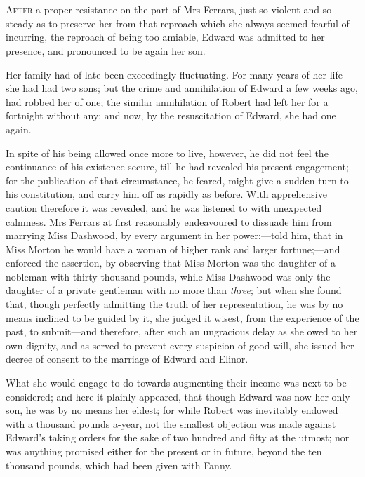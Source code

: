 \chapter[Chapter \thechapter]{}
\lettrine[lines=4,lraise=0.3]{A}{fter} a proper resistance on the part of Mrs Ferrars, just so violent and so steady as to preserve her from that reproach which she always seemed fearful of incurring, the reproach of being too amiable, Edward was admitted to her presence, and pronounced to be again her son.

Her family had of late been exceedingly fluctuating. For many years of her life she had had two sons; but the crime and annihilation of Edward a few weeks ago, had robbed her of one; the similar annihilation of Robert had left her for a fortnight without any; and now, by the resuscitation of Edward, she had one again.

In spite of his being allowed once more to live, however, he did not feel the continuance of his existence secure, till he had revealed his present engagement; for the publication of that circumstance, he feared, might give a sudden turn to his constitution, and carry him off as rapidly as before. With apprehensive caution therefore it was revealed, and he was listened to with unexpected calmness. Mrs Ferrars at first reasonably endeavoured to dissuade him from marrying Miss Dashwood, by every argument in her power;—told him, that in Miss Morton he would have a woman of higher rank and larger fortune;—and enforced the assertion, by observing that Miss Morton was the daughter of a nobleman with thirty thousand pounds, while Miss Dashwood was only the daughter of a private gentleman with no more than \textit{three}; but when she found that, though perfectly admitting the truth of her representation, he was by no means inclined to be guided by it, she judged it wisest, from the experience of the past, to submit—and therefore, after such an ungracious delay as she owed to her own dignity, and as served to prevent every suspicion of good-will, she issued her decree of consent to the marriage of Edward and Elinor.

What she would engage to do towards augmenting their income was next to be considered; and here it plainly appeared, that though Edward was now her only son, he was by no means her eldest; for while Robert was inevitably endowed with a thousand pounds a-year, not the smallest objection was made against Edward’s taking orders for the sake of two hundred and fifty at the utmost; nor was anything promised either for the present or in future, beyond the ten thousand pounds, which had been given with Fanny.

